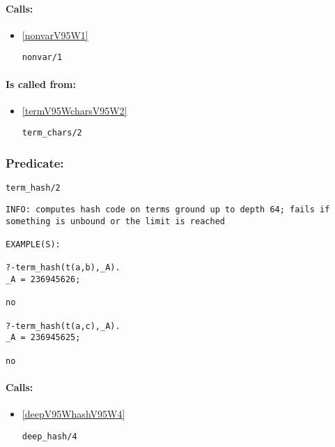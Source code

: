 \paragraph{Calls:} 
\begin{itemize}
\item \ref{nonvarV95W1} 
\begin{verbatim}
nonvar/1
\end{verbatim}

\end{itemize}
\paragraph{Is called from:} 
\begin{itemize}
\item \ref{termV95WcharsV95W2} 
\begin{verbatim}
term_chars/2
\end{verbatim}

\end{itemize}

\subsubsection{Predicate:} \label{termV95WhashV95W2}

\begin{verbatim}
term_hash/2
\end{verbatim}

{\small \begin{verbatim}
INFO: computes hash code on terms ground up to depth 64; fails if something is unbound or the limit is reached

EXAMPLE(S):

?-term_hash(t(a,b),_A).
_A = 236945626;

no

?-term_hash(t(a,c),_A).
_A = 236945625;

no

\end{verbatim}}
\paragraph{Calls:} 
\begin{itemize}
\item \ref{deepV95WhashV95W4} 
\begin{verbatim}
deep_hash/4
\end{verbatim}

\end{itemize}

